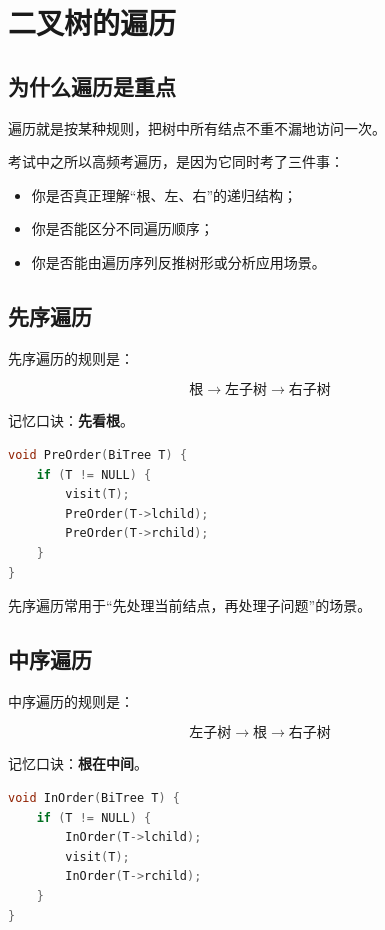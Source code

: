 \documentclass{../../note}
\begin{document}
\section{二叉树的遍历}

\subsection{为什么遍历是重点}

遍历就是按某种规则，把树中所有结点不重不漏地访问一次。

考试中之所以高频考遍历，是因为它同时考了三件事：

\begin{itemize}
  \item 你是否真正理解“根、左、右”的递归结构；
  \item 你是否能区分不同遍历顺序；
  \item 你是否能由遍历序列反推树形或分析应用场景。
\end{itemize}

\subsection{先序遍历}

先序遍历的规则是：

\[
\text{根} \rightarrow \text{左子树} \rightarrow \text{右子树}
\]

记忆口诀：\textbf{先看根}。

\begin{lstlisting}[language=C]
void PreOrder(BiTree T) {
    if (T != NULL) {
        visit(T);
        PreOrder(T->lchild);
        PreOrder(T->rchild);
    }
}
\end{lstlisting}

先序遍历常用于“先处理当前结点，再处理子问题”的场景。

\subsection{中序遍历}

中序遍历的规则是：

\[
\text{左子树} \rightarrow \text{根} \rightarrow \text{右子树}
\]

记忆口诀：\textbf{根在中间}。

\begin{lstlisting}[language=C]
void InOrder(BiTree T) {
    if (T != NULL) {
        InOrder(T->lchild);
        visit(T);
        InOrder(T->rchild);
    }
}
\end{lstlisting}
\end{document}
